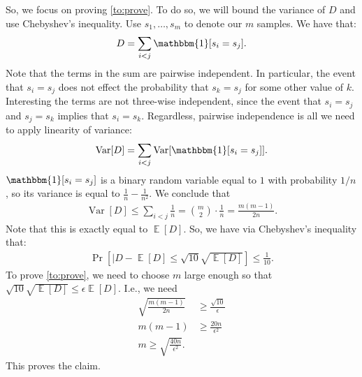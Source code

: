 \documentclass[11pt]{article}
\DeclareMathOperator*{\E}{\mathbb{E}}
\DeclareMathOperator{\var}{Var}
\begin{document}
So, we focus on proving \eqref{to:prove}. To do so, we will bound the variance of $D$ and use Chebyshev's inequality. Use $s_1, \ldots, s_m$ to denote our $m$ samples. We have that:
\begin{align*}
	D = \sum_{i < j} \mathbbm{1}[s_i = s_j].
\end{align*}
Note that the terms in the sum are pairwise independent. In particular, the event that $s_i = s_j$ does not effect the probability that $s_k = s_j$ for some other value of $k$. Interesting the terms are not three-wise independent, since the event that $s_i = s_j$ and $s_j = s_k$ implies that $s_i = s_k$. Regardless, pairwise independence is all we need to apply linearity of variance: 
\begin{align*}
	\var[D] = \sum_{i < j} \var[\mathbbm{1}[s_i = s_j]].
\end{align*}
$\mathbbm{1}[s_i = s_j]$ is a binary random variable equal to $1$ with probability $1/n$, so its variance is equal to $\frac{1}{n} - \frac{1}{n^2}$. We conclude that 
\begin{align*}
	\var[D] \leq \sum_{i < j} \frac{1}{n} = \binom{m}{2}\cdot \frac{1}{n} = \frac{m(m-1)}{2n}.
\end{align*}
Note that this is exactly equal to $\E[D]$. So, we have via Chebyshev's inequality that:
\begin{align*}
	\Pr\left[|D - \E[D] \leq \sqrt{10}\sqrt{\E[D]}\right] \leq \frac{1}{10}.
\end{align*}
To prove \eqref{to:prove}, we need to choose $m$ large enough so that $\sqrt{10}\sqrt{\E[D]} \leq \epsilon \E[D]$. I.e., we need
\begin{align*}
	\sqrt{\frac{m(m-1)}{2n}} &\geq \frac{\sqrt{10}}{\epsilon}\\
	m(m-1) &\geq \frac{20 n}{\epsilon^2} \\
	m \geq \sqrt{\frac{40n}{\epsilon^2}}.
\end{align*}
This proves the claim.

\end{document}
